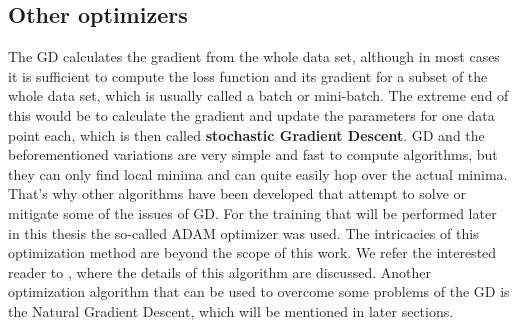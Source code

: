 \subsection{Other optimizers}
The GD calculates the gradient from the whole data set, although in most cases it is sufficient to compute the loss function and its gradient for a subset of the whole data set, which is usually called a batch or mini-batch. The extreme end of this would be to calculate the gradient and update the parameters for one data point each, which is then called \textbf{stochastic Gradient Descent}.
GD and the beforementioned variations are very simple and fast to compute algorithms, but they can only find local minima and can quite easily hop over the actual minima. That's why other algorithms have been developed that attempt to solve or mitigate some of the issues of GD. For the training that will be performed later in this thesis the so-called ADAM optimizer was used. The intricacies of this optimization method are beyond the scope of this work. We refer the interested reader to \cite{adamPaper}, where the details of this algorithm are discussed. Another optimization algorithm that can be used to overcome some problems of the GD is the Natural Gradient Descent, which will be mentioned in later sections.


